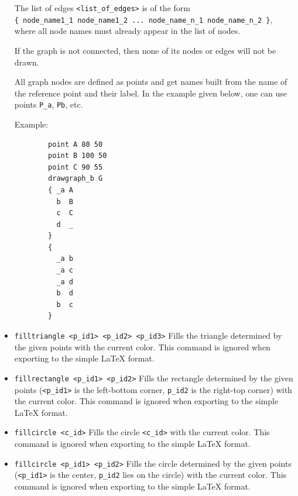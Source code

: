 \documentclass[a4paper]{book}
\begin{document}
\begin{itemize}
        The list of edges \verb|<list_of_edges>| is of the form \\
        \verb|{ node_name1_1 node_name1_2 ... node_name_n_1 node_name_n_2 }|,
        where all node names must already appear in the list of nodes.

        If the graph is not connected, then none of its nodes or edges
        will not be drawn.

        All graph nodes are defined as {\sc point}s and get names built from
        the name of the reference point and their label. In the example
        given below, one can use points \verb|P_a|, \verb|Pb|, etc.

        Example:

        \begin{verbatim}
        point A 80 50
        point B 100 50
        point C 90 55
        drawgraph_b G
        { _a A
          b  B
          c  C
          d  _
        }
        {
          _a b
          _a c
          _a d
          b  d
          b  c
        }
        \end{verbatim}

\item \verb|filltriangle <p_id1> <p_id2> <p_id3>|
        Fills the triangle determined by the given points
        with the current color. This command is ignored
        when exporting to the simple \LaTeX{} format.

\item \verb|fillrectangle <p_id1> <p_id2>|
        Fills the rectangle determined by the given points
        (\verb|<p_id1>| is the left-bottom corner, \verb|p_id2|
        is the right-top corner) with the current color.
        This command is ignored when exporting to the
        simple \LaTeX{} format.

\item \verb|fillcircle <c_id>|
        Fills the circle \verb|<c_id>| with the current color.
        This command is ignored when exporting to the
        simple \LaTeX{} format.

\item \verb|fillcircle <p_id1> <p_id2>|
        Fills the circle determined by the given points
        (\verb|<p_id1>| is the center, \verb|p_id2| lies
        on the circle) with the current color.
        This command is ignored when exporting to the
        simple \LaTeX{} format.


\end{itemize}
\end{document}
